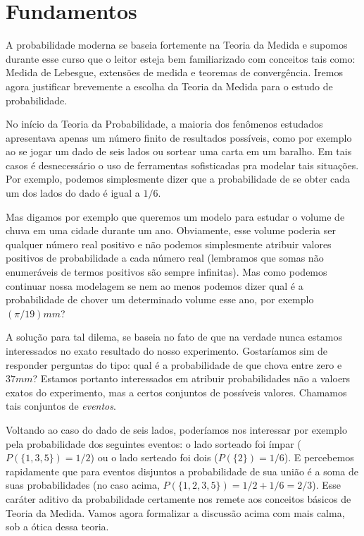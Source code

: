 \documentclass[../main/Notas_de_aula.tex]{subfiles}
\begin{document}
\chapter{Fundamentos}

A probabilidade moderna se baseia fortemente na Teoria da Medida e supomos durante esse curso que o leitor esteja bem familiarizado com conceitos tais como: Medida de Lebesgue, extensões de medida e teoremas de convergência.
Iremos agora justificar brevemente a escolha da Teoria da Medida para o estudo de probabilidade.

No início da Teoria da Probabilidade, a maioria dos fenômenos estudados apresentava apenas um número finito de resultados possíveis, como por exemplo ao se jogar um dado de seis lados ou sortear uma carta em um baralho.
Em tais casos é desnecessário o uso de ferramentas sofisticadas pra modelar tais situações.
Por exemplo, podemos simplesmente dizer que a probabilidade de se obter cada um dos lados do dado é igual a $1/6$.

Mas digamos por exemplo que queremos um modelo para estudar o volume de chuva em uma cidade durante um ano.
Obviamente, esse volume poderia ser qualquer número real positivo e não podemos simplesmente atribuir valores positivos de probabilidade a cada número real (lembramos que somas não enumeráveis de termos positivos são sempre infinitas).
Mas como podemos continuar nossa modelagem se nem ao menos podemos dizer qual é a probabilidade de chover um determinado volume esse ano, por exemplo $(\pi/19)mm$?

A solução para tal dilema, se baseia no fato de que na verdade nunca estamos interessados no exato resultado do nosso experimento.
Gostaríamos sim de responder perguntas do tipo: qual é a probabilidade de que chova entre zero e $37mm$?
Estamos portanto interessados em atribuir probabilidades não a valoers exatos do experimento, mas a certos conjuntos de possíveis valores.
Chamamos tais conjuntos de \emph{eventos}. 

Voltando ao caso do dado de seis lados, poderíamos nos interessar por exemplo pela probabilidade dos seguintes eventos: o lado sorteado foi ímpar ($P(\{1,3,5\}) = 1/2$) ou o lado serteado foi dois ($P(\{2\}) = 1/6$).
E percebemos rapidamente que para eventos disjuntos a probabilidade de sua união é a soma de suas probabilidades (no caso acima, $P(\{1,2,3,5\}) = 1/2 + 1/6 = 2/3$).
Esse caráter aditivo da probabilidade certamente nos remete aos conceitos básicos de Teoria da Medida.
Vamos agora formalizar a discussão acima com mais calma, sob a ótica dessa teoria.
\end{document}
